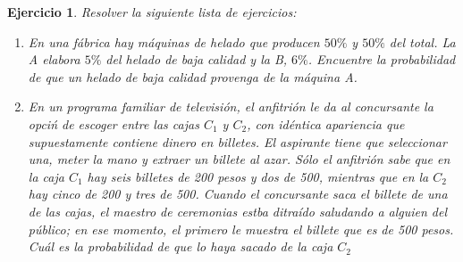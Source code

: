 \documentclass[12pt,twoside]{article}
\newtheorem{Ejer}{Ejercicio}
\begin{document}
\begin{Ejer} Resolver la siguiente lista de ejercicios:
\begin{enumerate}

\item En una f\'abrica hay m\'aquinas de helado que producen $50\%$ y $50\%$ del total.  La A elabora $5\%$ del helado de baja calidad y la B, $6\%$. Encuentre la probabilidad de que un helado de baja calidad provenga de la m\'aquina A.

\item En un programa familiar de televisi\'on, el anfitri\'on le da al concursante la opci\'n de escoger entre las cajas $C_{1}$ y $C_{2}$, con id\'entica apariencia que supuestamente contiene dinero en billetes. El aspirante tiene que seleccionar una, meter la mano y extraer un billete al azar. S\'olo el anfitri\'on sabe que en la caja $C_{1}$ hay seis billetes de 200 pesos y dos de 500, mientras que en la $C_{2}$ hay cinco de 200 y tres de 500. Cuando el concursante saca el billete de una de las cajas, el maestro de ceremonias estba ditra\'ido saludando a alguien del p\'ublico; en ese momento, el primero le muestra el billete que es de 500 pesos. Cu\'al es la probabilidad de que lo haya sacado de la caja $C_{2}$
\end{enumerate}


\end{Ejer}
\end{document}
